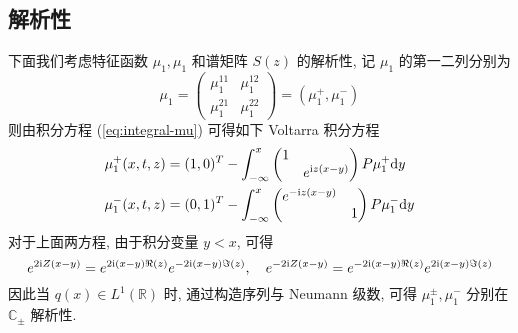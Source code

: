 \subsection{解析性}
下面我们考虑特征函数 $ \mu_{1}, \mu_{1} $ 和谱矩阵 $ S(z) $ 的解析性, 记 $ \mu_{1} $ 的第一二列分别为
\begin{equation}
  \mu_{1} =
  \begin{pmatrix}
    \mu_{1}^{11} & \mu_{1}^{12} \\ \mu_{1}^{21} & \mu_{1}^{22}
  \end{pmatrix} = (\mu_{1}^{+}, \mu_{1}^{-}) \label{eq:mu-1-matrix}
\end{equation}
则由积分方程 (\ref{eq:integral-mu}) 可得如下 Voltarra 积分方程
  \begin{align}
    \mu_{1}^{+}(x,t,z) &= (1,0)^T - \int^{x}_{-\infty}  \begin{pmatrix} 1 &  \\  & e^{ \mathrm{i} z (x - y)} \end{pmatrix} P \mu_{1}^{+} \mathrm{d} y \label{eq:Voltarra-mu-1}\\
    \mu_{1}^{-}(x,t,z) &= (0,1)^T - \int^{x}_{-\infty}  \begin{pmatrix} e^{-\mathrm{i} z (x - y)} &  \\  & 1 \end{pmatrix} P \mu_{1}^{-} \mathrm{d} y \label{eq:Voltarra-mu-2}
  \end{align}
对于上面两方程, 由于积分变量 $ y < x $, 可得
\begin{equation*}
  e^{2 \mathrm{i} Z (x-y)} = e^{2 \mathrm{i} (x-y)\Re(z)}  e^{-2 \mathrm{i} (x-y)\Im(z)}, \quad   e^{- 2 \mathrm{i} Z (x-y)} = e^{- 2 \mathrm{i} (x-y)\Re(z)}  e^{2 \mathrm{i} (x-y)\Im(z)}  
\end{equation*}
因此当 $ q(x) \in L^{1}(\mathbb{R}) $ 时, 通过构造序列与 Neumann 级数, 可得 $ \mu_{1}^{\pm}, \mu_{1}^{-} $ 分别在 $ \mathbb{C}_{\pm} $ 解析性.

